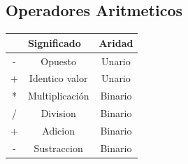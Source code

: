 \documentclass{article}
\begin{document}
\subsection{Operadores Aritmeticos}
\begin{table}[H]\centering
    \begin{tabular}{c|c|c}
    \hline
    \rowcolor[HTML]{C0C0C0} 
    \multicolumn{1}{|l|}{\cellcolor[HTML]{C0C0C0}Operador} & \multicolumn{1}{|l|}{\cellcolor[HTML]{C0C0C0}Significado}                                                                                                                 & \multicolumn{1}{l|}{\cellcolor[HTML]{C0C0C0}Aridad} \\ \hline
    \multicolumn{1}{|c|}{-}                                & Opuesto                                                                                                                                                                  & \multicolumn{1}{c|}{Unario}                         \\ \hline
    \multicolumn{1}{|c|}{+}                                & Identico valor                                                                                                                                                           & \multicolumn{1}{c|}{Unario}                         \\ \hline
    \multicolumn{1}{|c|}{*}                                & Multiplicación                                                                                                                                                           & \multicolumn{1}{c|}{Binario}                        \\ \hline
    \multicolumn{1}{|c|}{/}                                & Division                                                                                                                                                                 & \multicolumn{1}{c|}{Binario}                        \\ \hline
    \multicolumn{1}{|c|}{+}                                & Adicion                                                                                                                                                                  & \multicolumn{1}{c|}{Binario}                        \\ \hline
    \multicolumn{1}{|c|}{-}                                & Sustraccion                                                                                                                                                              & \multicolumn{1}{c|}{Binario}                        \\ \hline

\end{tabular}
\end{table}
\end{document}
